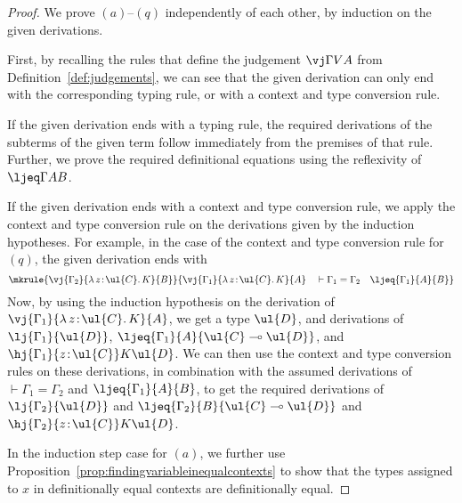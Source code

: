 \begin{proof}
We prove $(a)$--$(q)$ independently of each other, by induction on the given derivations. 

First, by recalling the rules that define the judgement $\vj \Gamma V A$ from Definition~\ref{def:judgements}, we can see that the given derivation can only end with the corresponding typing rule, or with a context and type conversion rule.

If the given derivation ends with a typing rule, the required derivations of the subterms of the given term follow immediately from the premises of that rule. Further, we prove the required definitional equations using the reflexivity of $\ljeq \Gamma A B$. 

If the given derivation ends with a context and type conversion rule, we apply the context and type conversion rule on the derivations given by the induction hypotheses.  For example, in the case of the context and type conversion rule for $(q)$, the given derivation ends with 
\[
\mkrule
{\vj {\Gamma_2} {\lambda\, z \!:\! \ul{C} .\, K} {B}}
{\vj {\Gamma_1} {\lambda\, z \!:\! \ul{C} .\, K} {A} \quad \vdash \Gamma_1 = \Gamma_2 \quad \ljeq {\Gamma_1} {A} {B}}
\]
Now, by using the induction hypothesis on the derivation of $\vj {\Gamma_1} {\lambda\, z \!:\! \ul{C} .\, K} {A}$, we get a type $\ul{D}$, and derivations of $\lj {\Gamma_1} {\ul{D}}$, $\ljeq {\Gamma_1} {A} {\ul{C} \multimap \ul{D}}$, and $\hj {\Gamma_1} {z \!:\! \ul{C}} K {\ul{D}}$. We can \linebreak then use the context and type conversion rules on these derivations, in combination with the assumed derivations of $\vdash \Gamma_1 = \Gamma_2$ and $\ljeq {\Gamma_1} {A} {B}$, to get the required derivations of $\lj {\Gamma_2} {\ul{D}}$ and $\ljeq {\Gamma_2} {B} {\ul{C} \multimap \ul{D}}$ and $\hj {\Gamma_2} {z \!:\! \ul{C}} K {\ul{D}}$.

In the induction step case for $(a)$, we further use Proposition~\ref{prop:findingvariableinequalcontexts} to show that the types assigned to $x$ in definitionally equal contexts are definitionally equal.
\end{proof}

